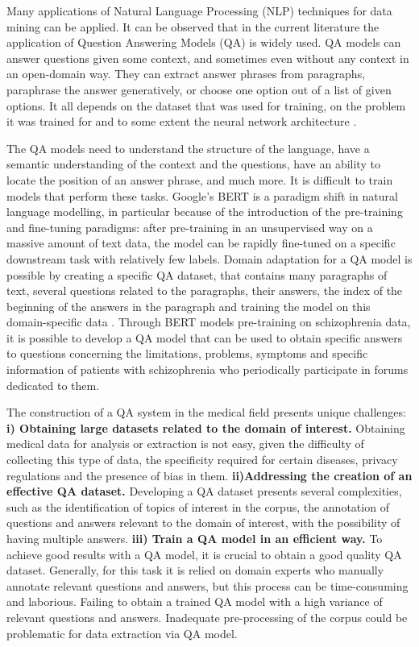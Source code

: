 \documentclass[runningheads]{llncs}
\begin{document}
Many applications of Natural Language Processing (NLP) techniques for data mining can be applied. It can be observed that in the current literature \cite{c2,c4,c6,c9} the application of Question Answering Models (QA) is widely used.
QA models can answer questions given some context, and sometimes even without any context in an open-domain way. They can extract answer phrases from paragraphs, paraphrase the answer generatively, or choose one option out of a list of given options. It all depends on the dataset that was used for training, on the problem it was trained for and to some extent the neural network architecture \cite{c4}.

The QA models need to understand the structure of the language, have a semantic understanding of the context and the questions, have an ability to locate the position of an answer phrase, and much more. It is difficult to train models that perform these tasks.
Google's BERT \cite{c2} is a paradigm shift in natural language modelling, in particular because of the introduction of the pre-training and fine-tuning paradigms: after pre-training in an unsupervised way on a massive amount of text data, the model can be rapidly fine-tuned on a specific downstream task with relatively few labels. Domain adaptation for a QA model is possible  by creating a specific QA dataset, that contains many paragraphs of text, several questions related to the paragraphs, their answers, the index of the beginning of the answers in the paragraph and training the model on this domain-specific data \cite{c2}. 
Through BERT models pre-training on schizophrenia data, it is possible to develop a QA model that can be used to obtain specific answers to questions concerning the limitations, problems, symptoms and specific information of patients with schizophrenia who periodically participate in forums dedicated to them. 

The construction of a QA system in the medical field presents unique challenges: \textbf{i) Obtaining large datasets related to the domain of interest.} Obtaining medical data for analysis or extraction is not easy, given the difficulty of collecting this type of data, the specificity required for certain diseases, privacy regulations and the presence of bias in them. \textbf{ ii)Addressing the creation of an effective QA dataset.} Developing a QA dataset presents several complexities, such as the identification of topics of interest in the corpus, the annotation of questions and answers relevant to the domain of interest, with the possibility of having multiple answers. \textbf{ iii) Train a QA model in an efficient way.} To achieve good results with a QA model, it is crucial to obtain a good quality QA dataset. Generally, for this task it is relied on domain experts who manually annotate relevant questions and answers, but this process can be time-consuming and laborious. Failing to obtain a trained QA model with a high variance of relevant questions and answers. Inadequate pre-processing of the corpus could be problematic for data extraction via QA model.
\end{document}
